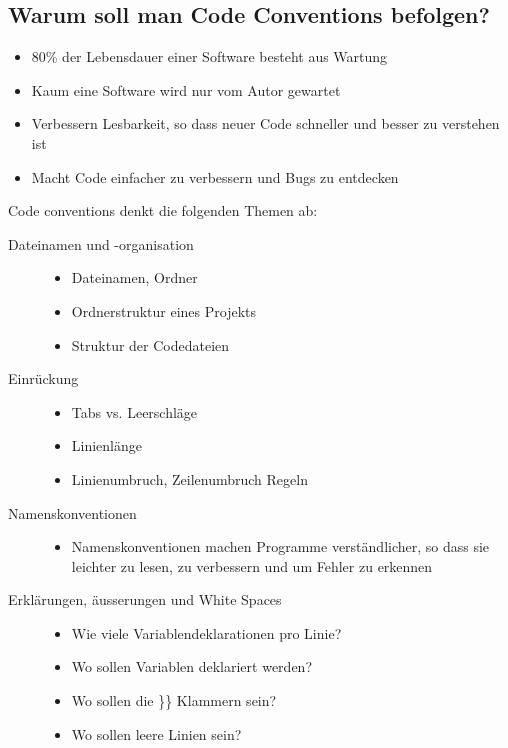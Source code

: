 \documentclass[a4paper,10pt]{article}
\begin{document}
\subsection{Warum soll man Code Conventions befolgen?}
\begin{itemize}
\item 80\% der Lebensdauer einer Software besteht aus Wartung
\item Kaum eine Software wird nur vom Autor gewartet
\item Verbessern Lesbarkeit, so dass neuer Code schneller und besser zu verstehen ist
\item Macht Code einfacher zu verbessern und Bugs zu entdecken
\end{itemize}
Code conventions denkt die folgenden Themen ab: 
\begin{description}
	\item[Dateinamen und -organisation] \hfill 
		\begin{itemize}
			\item Dateinamen, Ordner
			\item Ordnerstruktur eines Projekts
			\item Struktur der Codedateien
		\end{itemize}
	\item[Einr\"{u}ckung] \hfill
		\begin{itemize}
			\item Tabs vs. Leerschl\"{a}ge
			\item Linienl\"{a}nge
			\item Linienumbruch, Zeilenumbruch Regeln
		\end{itemize}
	\item[Namenskonventionen] \hfill
		\begin{itemize}
			\item Namenskonventionen machen Programme verst\"{a}ndlicher, so dass sie leichter zu lesen, zu verbessern und um Fehler zu erkennen
		\end{itemize}
	\item[Erkl\"{a}rungen, \"{a}usserungen und White Spaces] \hfill 
		\begin{itemize}
			\item Wie viele Variablendeklarationen pro Linie?
			\item Wo sollen Variablen deklariert werden?
			\item Wo sollen die \}\} Klammern sein?
			\item Wo sollen leere Linien sein?
		\end{itemize}
\end{description}
\end{document}
